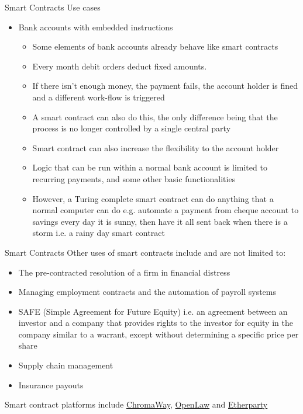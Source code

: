 \documentclass[10pt]{beamer}
\begin{document}

\begin{frame}{Smart Contracts}
	Use cases
	\begin{itemize}
		\item Bank accounts with embedded instructions
		\begin{itemize}
			\item Some elements of bank accounts already behave like smart contracts
			\item Every month debit orders deduct fixed amounts.
			\item If there isn't enough money, the payment fails, the account holder is fined and a different work-flow is triggered
			\item A smart contract can also do this, the only difference being that the process is no longer controlled by a single central party
			\item Smart contract can also increase the flexibility to the account holder
			\item Logic that can be run within a normal bank account is limited to recurring payments, and some other basic functionalities
			\item However, a Turing complete smart contract can do anything that a normal computer can do e.g. automate a payment from cheque account to savings every day it is sunny, then have it all sent back when there is a storm i.e. a rainy day smart contract
		\end{itemize}
	\end{itemize}
\end{frame}


\begin{frame}{Smart Contracts}
	Other uses of smart contracts include and are not limited to:
		\begin{itemize}
			\item The pre-contracted resolution of a firm in financial distress
			\item Managing employment contracts and the automation of payroll systems
			\item SAFE (Simple Agreement for Future Equity) i.e. an agreement between an investor and a company that provides rights to the investor for equity in the company similar to a warrant, except without determining a specific price per share
			\item Supply chain management
			\item Insurance payouts
		\end{itemize}
	Smart contract platforms include \href{https://chromaway.com/}{ChromaWay}, \href{http://openlaw.io/}{OpenLaw} and \href{https://etherparty.io/}{Etherparty}
\end{frame}
\end{document}
